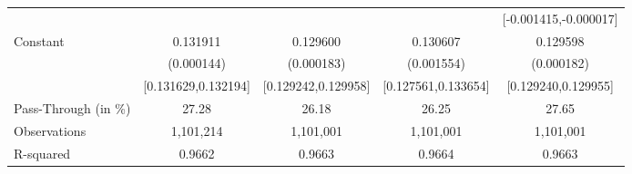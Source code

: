 {\begin{tabular}{l*{4}{c}}
                    &                     &                     &                     &[-0.001415,-0.000017]         \\
Constant            &    0.131911\sym{***}&    0.129600\sym{***}&    0.130607\sym{***}&    0.129598\sym{***}\\
                    &  (0.000144)         &  (0.000183)         &  (0.001554)         &  (0.000182)         \\
                    &[0.131629,0.132194]         &[0.129242,0.129958]         &[0.127561,0.133654]         &[0.129240,0.129955]         \\
\midrule
Pass-Through (in \%)&       27.28         &       26.18         &       26.25         &       27.65         \\
Observations        &   1,101,214         &   1,101,001         &   1,101,001         &   1,101,001         \\
R-squared           &      0.9662         &      0.9663         &      0.9664         &      0.9663         \\
\bottomrule
\end{tabular}
}
